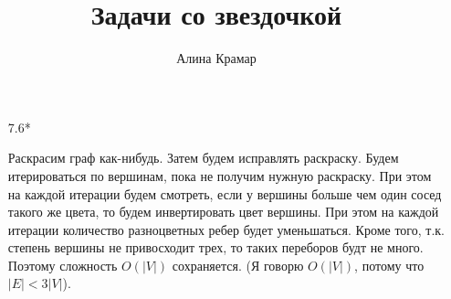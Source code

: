 \documentclass{article}
\begin{document}
\title{Задачи со звездочкой}
\author{Алина Крамар}

\maketitle
\begin{enumerate}

\item[7.6*]

Раскрасим граф как-нибудь. Затем будем исправлять раскраску.
Будем итерироваться по вершинам, пока не получим нужную раскраску. При
этом на каждой итерации будем смотреть, если у вершины больше чем один
сосед такого же цвета, то будем инвертировать цвет вершины. При этом
на каждой итерации количество разноцветных ребер будет
уменьшаться. Кроме того, т.к. степень вершины не привосходит трех, то
таких переборов будт не много. Поэтому сложность $O(|V|)$
сохраняется. (Я говорю $O(|V|)$, потому что $|E| < 3|V|$).

\end{enumerate}
\end{document}
